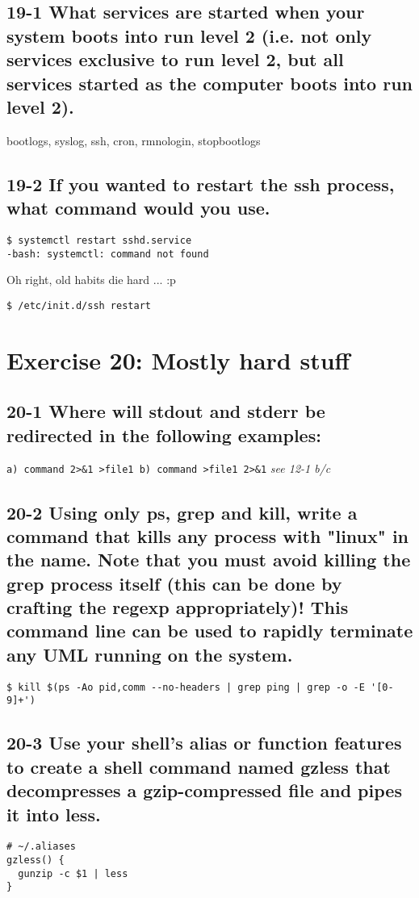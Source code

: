 \subsection{19-1 What services are started when your system boots into run level 2 (i.e. not only services exclusive to run level 2, but all services started as the computer boots into run level 2).}
bootlogs, syslog, ssh, cron, rmnologin, stopbootlogs

\subsection{19-2 If you wanted to restart the ssh process, what command would you use.}
\begin{verbatim}
$ systemctl restart sshd.service
-bash: systemctl: command not found
\end{verbatim}

Oh right, old habits die hard ... :p

\verb=$ /etc/init.d/ssh restart=


\section{Exercise 20: Mostly hard stuff}
\subsection{20-1 Where will stdout and stderr be redirected in the following examples:}
\verb=a) command 2>&1 >file1 b) command >file1 2>&1=
\emph{see 12-1 b/c}

\subsection{20-2 Using only ps, grep and kill, write a command that kills any process with "linux" in the name. Note that you must avoid killing the grep process itself (this can be done by crafting the regexp appropriately)! This command line can be used to rapidly terminate any UML running on the system.}
\begin{verbatim}$ kill $(ps -Ao pid,comm --no-headers | grep ping | grep -o -E '[0-9]+')\end{verbatim}

\subsection{20-3 Use your shell's alias or function features to create a shell command named gzless that decompresses a gzip-compressed file and pipes it into less.}
\begin{verbatim}
# ~/.aliases
gzless() {
  gunzip -c $1 | less
}
\end{verbatim}

